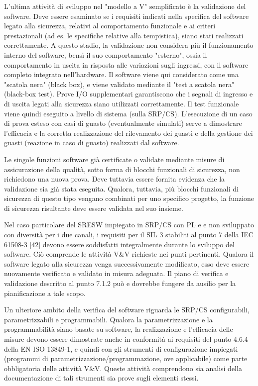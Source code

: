 L'ultima attività di sviluppo nel "modello a V" semplificato è la validazione del software. Deve essere esaminato se i requisiti indicati nella specifica del software legato alla sicurezza, relativi al comportamento funzionale e ai criteri prestazionali (ad es. le specifiche relative alla tempistica), siano stati realizzati correttamente. A questo stadio, la validazione non considera più il funzionamento interno del software, bensì il suo comportamento "esterno", ossia il comportamento in uscita in risposta alle variazioni sugli ingressi, con il software completo integrato nell'hardware. Il software viene qui considerato come una "scatola nera" (black box), e viene validato mediante il "test a scatola nera" (black-box test). Prove I/O supplementari garantiscono che i segnali di ingresso e di uscita legati alla sicurezza siano utilizzati correttamente. Il test funzionale viene quindi eseguito a livello di sistema (sulla SRP/CS). L'esecuzione di un caso di prova esteso con casi di guasto (eventualmente simulati) serve a dimostrare l'efficacia e la corretta realizzazione del rilevamento dei guasti e della gestione dei guasti (reazione in caso di guasto) realizzati dal software.

Le singole funzioni software già certificate o validate mediante misure di assicurazione della qualità, sotto forma di blocchi funzionali di sicurezza, non richiedono una nuova prova. Deve tuttavia essere fornita evidenza che la validazione sia già stata eseguita. Qualora, tuttavia, più blocchi funzionali di sicurezza di questo tipo vengano combinati per uno specifico progetto, la funzione di sicurezza risultante deve essere validata nel suo insieme.

Nel caso particolare del SRESW impiegato in SRP/CS con PL e e non sviluppato con diversità per i due canali, i requisiti per il SIL 3 stabiliti al punto 7 della IEC 61508-3 [42] devono essere soddisfatti integralmente durante lo sviluppo del software. Ciò comprende le attività V\&V richieste nei punti pertinenti.
Qualora il software legato alla sicurezza venga successivamente modificato, esso deve essere nuovamente verificato e validato in misura adeguata. Il piano di verifica e validazione descritto al punto 7.1.2 può e dovrebbe fungere da ausilio per la pianificazione a tale scopo.

Un ulteriore ambito della verifica del software riguarda le SRP/CS configurabili, parametrizzabili e programmabili. Qualora la parametrizzazione e la programmabilità siano basate su software, la realizzazione e l'efficacia delle misure devono essere dimostrate anche in conformità ai requisiti del punto 4.6.4 della EN ISO 13849-1, e quindi con gli strumenti di configurazione impiegati (programmi di parametrizzazione/programmazione, ove applicabile) come parte obbligatoria delle attività V\&V. Queste attività comprendono sia analisi della documentazione di tali strumenti sia prove sugli elementi stessi.

